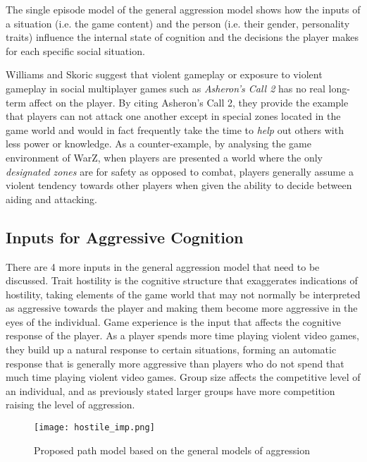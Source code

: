 \documentclass[12pt]{report}
\begin{document}
The single episode model of the general aggression model shows how the inputs of a situation (i.e. the game content) and the person (i.e. their gender, personality traits) influence the internal state of cognition and the decisions the player makes for each specific social situation.\cite{Hostile_expectations}

Williams and Skoric suggest that violent gameplay or exposure to violent gameplay in social multiplayer games such as \textit{Asheron's Call 2} has no real long-term affect on the player.\cite{Hostile_expectations} By citing Asheron's Call 2, they provide the example that players can not attack one another except in special zones located in the game world and would in fact frequently take the time to \textit{help} out others with less power or knowledge.
As a counter-example, by analysing the game environment of WarZ, when players are presented a world where the only \textit{designated zones} are for safety as opposed to combat, players generally assume a violent tendency towards other players when given the ability to decide between aiding and attacking.

\subsection{Inputs for Aggressive Cognition}
There are 4 more inputs in the general aggression model that need to be discussed. Trait hostility is the cognitive structure that exaggerates indications of hostility, taking elements of the game world that may not normally be interpreted as aggressive towards the player and making them become more aggressive in the eyes of the individual. Game experience is the input that affects the cognitive response of the player. As a player spends more time playing violent video games, they build up a natural response to certain situations, forming an automatic response that is generally more aggressive than players who do not spend that much time playing violent video games. Group size affects the competitive level of an individual, and as previously stated larger groups have more competition raising the level of aggression.

\begin{figure}[h]
\begin{center}
\leavevmode
\texttt{[image: hostile\_imp.png]}
\end{center}
\caption{Proposed path model based on the general models of aggression \cite{Hostile_expectations}}
\label{fig:hostile_expectation_bias}
\end{figure}
\end{document}
